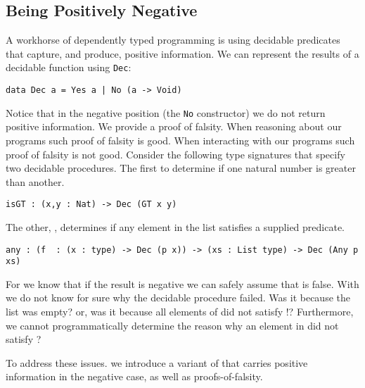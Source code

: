 \subsection{Being Positively Negative}
\label{sec:idioms:posneg}

A workhorse of dependently typed programming is using decidable
predicates that capture, and produce, positive information.
We can represent the results of a decidable function using \texttt{Dec}:

\begin{Verbatim}
data Dec a = Yes a | No (a -> Void)
\end{Verbatim}

\noindent
Notice that in the negative position (the \texttt{No} constructor) we do not return positive information.
We provide a proof of falsity.
When reasoning about our programs such proof of falsity is good.
When interacting with our programs such proof of falsity is not good.
Consider the following type signatures that specify two decidable procedures.
The first to determine if one natural number is greater than another.

\begin{Verbatim}
isGT : (x,y : Nat) -> Dec (GT x y)
\end{Verbatim}

\noindent
The other, , determines if any element in the list satisfies a supplied predicate.

\begin{Verbatim}
any : (f  : (x : type) -> Dec (p x)) -> (xs : List type) -> Dec (Any p xs)
\end{Verbatim}

For  we know that if the result is negative we can safely assume that   is false.
With  we do not know for sure why the decidable procedure failed.
Was it because the list was empty?
or,
was it because all elements of  did not satisfy !?
Furthermore, we cannot programmatically determine the reason why an element in  did not satisfy ?

To address these issues. we introduce  a variant of  that carries positive information in the negative case, as well as proofs-of-falsity.


